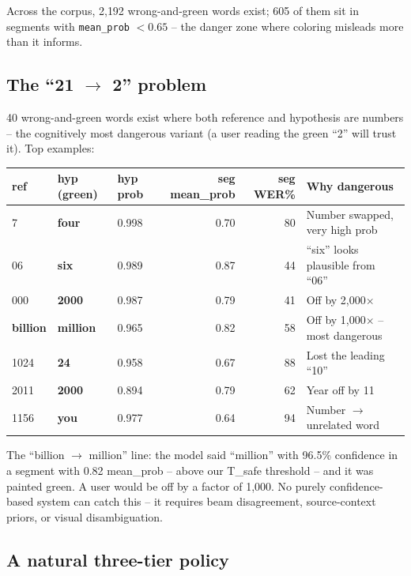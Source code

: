 \documentclass[11pt, a4paper]{article}
\begin{document}
Across the corpus, 2{,}192 wrong-and-green words exist; 605 of them sit in segments with \texttt{mean\_prob} $< 0.65$ -- the danger zone where coloring misleads more than it informs.

\subsection{The ``21 $\to$ 2'' problem}

40 wrong-and-green words exist where both reference and hypothesis are numbers -- the cognitively most dangerous variant (a user reading the green ``2'' will trust it). Top examples:

\begin{table}[H]
\centering
\small
\begin{tabular}{lllrrl}
\toprule
\textbf{ref} & \textbf{hyp (green)} & \textbf{hyp prob} & \textbf{seg mean\_prob} & \textbf{seg WER\%} & \textbf{Why dangerous} \\
\midrule
7      & \textbf{four}    & 0.998 & 0.70 & 80  & Number swapped, very high prob \\
06     & \textbf{six}     & 0.989 & 0.87 & 44  & ``six'' looks plausible from ``06'' \\
000    & \textbf{2000}    & 0.987 & 0.79 & 41  & Off by 2{,}000$\times$ \\
\textbf{billion} & \textbf{million} & 0.965 & 0.82 & 58 & Off by 1{,}000$\times$ -- most dangerous \\
1024   & \textbf{24}      & 0.958 & 0.67 & 88  & Lost the leading ``10'' \\
2011   & \textbf{2000}    & 0.894 & 0.79 & 62  & Year off by 11 \\
1156   & \textbf{you}     & 0.977 & 0.64 & 94  & Number $\to$ unrelated word \\
\bottomrule
\end{tabular}
\end{table}

The ``billion $\to$ million'' line: the model said ``million'' with 96.5\% confidence in a segment with 0.82 mean\_prob -- above our T\_safe threshold -- and it was painted green. A user would be off by a factor of 1{,}000. No purely confidence-based system can catch this -- it requires beam disagreement, source-context priors, or visual disambiguation.

\subsection{A natural three-tier policy}
\end{document}

